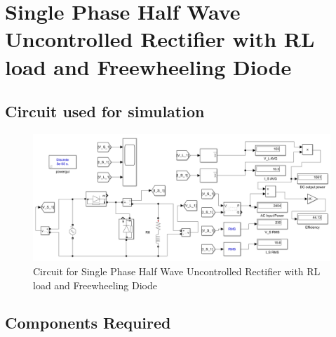 \section{Single Phase Half Wave Uncontrolled Rectifier with RL load and Freewheeling Diode}

\subsection{Circuit used for simulation}

\begin{figure}[h]
    \centering
    \includegraphics[width=1\textwidth]{images/experiment-1/circuit-diagram-experiment-03.png}
    \caption{Circuit for Single Phase Half Wave Uncontrolled Rectifier with RL load and Freewheeling Diode}
    \label{Fig_simulation_circuit_single-phase-half-wave-uncontrolled-rectifier-with-RL-load-and-freewheeling-diode}
\end{figure}

\subsection{Components Required}

